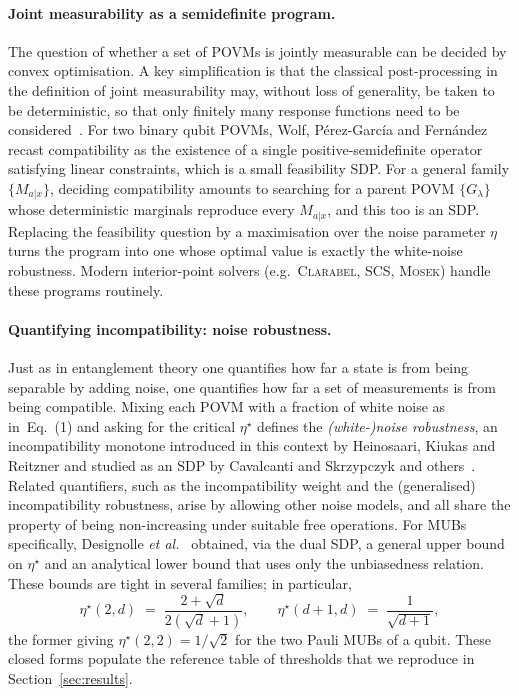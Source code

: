 \documentclass[oneside, a4paper, onecolumn, 11pt]{article}
\theoremstyle{definition}
\theoremstyle{plain}
\theoremstyle{remark}
\begin{document}
\paragraph{Joint measurability as a semidefinite program.}
The question of whether a set of POVMs is jointly measurable can be decided by
convex optimisation. A key simplification is that the classical post-processing
in the definition of joint measurability may, without loss of generality, be
taken to be deterministic, so that only finitely many response functions need to
be considered~\cite{Guhne2023}. For two binary qubit POVMs, Wolf, P\'erez-Garc\'ia
and Fern\'andez recast compatibility as the existence of a single
positive-semidefinite operator satisfying linear constraints, which is a small
feasibility SDP. For a general family $\{M_{a|x}\}$, deciding compatibility
amounts to searching for a parent POVM $\{G_\lambda\}$ whose deterministic
marginals reproduce every $M_{a|x}$, and this too is an SDP. Replacing the
feasibility question by a maximisation over the noise parameter $\eta$ turns the
program into one whose optimal value is exactly the white-noise robustness.
Modern interior-point solvers (e.g.\ \textsc{Clarabel}, \textsc{SCS},
\textsc{Mosek}) handle these programs routinely.
 
\paragraph{Quantifying incompatibility: noise robustness.}
Just as in entanglement theory one quantifies how far a state is from being
separable by adding noise, one quantifies how far a set of measurements is from
being compatible. Mixing each POVM with a fraction of white noise as
in~Eq.~(1) and asking for the critical $\eta^\star$ defines the
\emph{(white-)noise robustness}, an incompatibility monotone introduced in this
context by Heinosaari, Kiukas and Reitzner and studied as an SDP by Cavalcanti
and Skrzypczyk and others~\cite{Heinosaari2015,Designolle2019,Guhne2023}.
Related quantifiers, such as the incompatibility weight and the (generalised)
incompatibility robustness, arise by allowing other noise models, and all share
the property of being non-increasing under suitable free operations. For MUBs
specifically, Designolle \emph{et al.}~\cite{Designolle2019} obtained, via the
dual SDP, a general upper bound on $\eta^\star$ and an analytical lower bound
that uses only the unbiasedness relation. These bounds are tight in several
families; in particular,
\begin{equation}
  \eta^\star(2,d) \;=\; \frac{2+\sqrt{d}}{2(\sqrt{d}+1)},
  \qquad
  \eta^\star(d+1,d) \;=\; \frac{1}{\sqrt{d+1}},
\end{equation}
the former giving $\eta^\star(2,2) = 1/\sqrt{2}$ for the two Pauli MUBs of a
qubit. These closed forms populate the reference table of thresholds that we
reproduce in Section~\ref{sec:results}.
 
\end{document}
